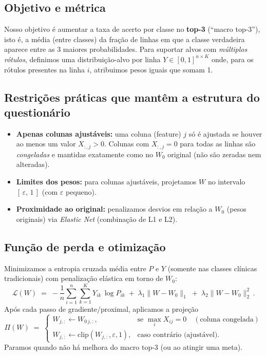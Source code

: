 \documentclass[11pt,a4paper]{article}
\begin{document}
\subsection*{Objetivo e métrica}
Nosso objetivo é aumentar a taxa de acerto por classe no \textbf{top-3} (``macro top-3''), isto é, a média (entre classes) da fração de linhas em que a classe verdadeira aparece entre as 3 maiores probabilidades.
Para suportar alvos com \emph{múltiplos rótulos}, definimos uma distribuição-alvo por linha $Y \in [0,1]^{n \times K}$ onde, para os rótulos presentes na linha $i$, atribuimos pesos iguais que somam 1.

\subsection*{Restrições práticas que mantêm a estrutura do questionário}
\begin{itemize}[leftmargin=1.5em]
  \item \textbf{Apenas colunas ajustáveis:} uma coluna (feature) $j$ só é ajustada se houver ao menos um valor $X_{:,j}>0$. Colunas com $X_{:,j}=0$ para todas as linhas são \emph{congeladas} e mantidas exatamente como no $W_0$ original (não são zeradas nem alteradas).
  \item \textbf{Limites dos pesos:} para colunas ajustáveis, projetamos $W$ no intervalo $[\,\varepsilon,\,1\,]$ (com $\varepsilon$ pequeno).
  \item \textbf{Proximidade ao original:} penalizamos desvios em relação a $W_0$ (pesos originais) via \emph{Elastic Net} (combinação de L1 e L2).
\end{itemize}

\subsection*{Função de perda e otimização}
Minimizamos a entropia cruzada média entre $P$ e $Y$ (somente nas classes clínicas tradicionais) com penalização elástica em torno de $W_0$:
\begin{equation}
  \mathcal{L}(W) \;=\; -\frac{1}{n}\sum_{i=1}^{n}\sum_{k=1}^{K} Y_{ik}\,\log P_{ik}
  \;+\; \lambda_1\lVert W-W_0 \rVert_1 \;+\; \lambda_2\lVert W-W_0 \rVert_2^2 \,.
\end{equation}
Após cada passo de gradiente/proximal, aplicamos a projeção
\begin{equation}
  \Pi(W) \;=\; 
  \begin{cases}
    W_{j,:} \leftarrow W_{0\,j,:}, & \text{se } \max_i X_{ij}=0 \quad (\text{coluna congelada})\\[2pt]
    W_{j,:} \leftarrow \mathrm{clip}(W_{j,:}, \varepsilon, 1), & \text{caso contrário (ajustável).}
  \end{cases}
\end{equation}
Paramos quando não há melhora do macro top-3 (ou ao atingir uma meta).
\end{document}
